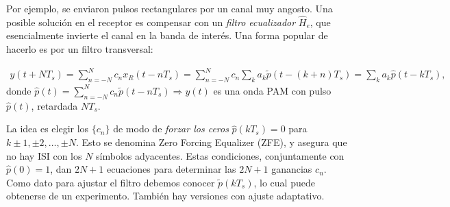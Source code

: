 \begin{figure}[htb]
    \centering\begin{minipage}{\textwidth}
    \endpgfgraphicnamed\end{minipage}
\end{figure}

Por ejemplo, se enviaron pulsos rectangulares por un canal muy
angosto. Una posible solución  en el receptor es compensar con un
\emph{filtro ecualizador} $\hat{H}_e$, que esencialmente invierte
el canal en la banda de interés. Una forma popular de hacerlo es
por un filtro transversal:

\begin{figure}[htb]
    \centering
    \resizebox{\textwidth}{!}{
    }
\end{figure}
\begin{align*} y(t+NT_s) = \sum_{n=-N}^N c_n {x}_R(t-nT_s) =\sum_{n=-N}^N
c_n \sum_k a_k \tilde{p}(t-(k+n)T_s) =\sum_k a_k\hat{p}(t - kT_s),%
\end{align*}%
donde $\hat{p}(t) =\sum_{n=-N}^N c_n \tilde{p}(t-nT_s)
\Longrightarrow y(t)$ es una onda PAM con pulso $\hat{p}(t)$,
retardada $NT_s$.

La idea es elegir los $\{c_n\}$ de modo de {\em forzar los ceros}
$\hat{p}(kT_s) = 0$ para $k\pm 1, \pm 2,\ldots,\pm N$. Esto se
denomina Zero Forcing Equalizer (ZFE), y  asegura que no hay ISI
con los $N$ símbolos adyacentes.  Estas condiciones,
conjuntamente con $\hat{p}(0)=1$, dan
 $2N+1$ ecuaciones para determinar las $2N+1$ ganancias $c_n$.
Como dato para ajustar el filtro debemos conocer
$\tilde{p}(kT_s)$, lo cual puede obtenerse de un experimento.
También hay versiones con ajuste adaptativo.

